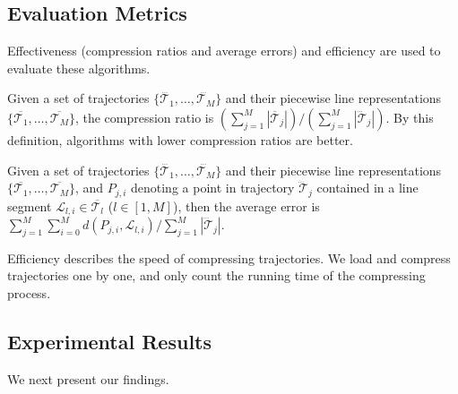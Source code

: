 \subsection{Evaluation Metrics}
Effectiveness (compression ratios and average errors) and efficiency are used to evaluate these algorithms.

Given a set of trajectories $\{\dddot{\mathcal{T}_1}, \ldots, \dddot{\mathcal{T}_M}\}$ and their piecewise line representations $\{\overline{\mathcal{T}_1}, \ldots, \overline{\mathcal{T}_M}\}$,
the compression ratio is $(\sum_{j=1}^{M} |\overline{\mathcal{T}}_j |)/(\sum_{j=1}^{M} |\dddot{\mathcal{T}}_j |)$.
By this definition, algorithms with lower compression ratios are better.

Given a set of trajectories $\{\dddot{\mathcal{T}_1}, \ldots, \dddot{\mathcal{T}_M}\}$ and their piecewise line representations
$\{\overline{\mathcal{T}_1}, \ldots, \overline{\mathcal{T}_M}\}$, and $P_{j,i}$ denoting
a point in trajectory $\dddot{\mathcal{T}}_j$ contained in a line segment $\mathcal{L}_{l,i}\in\overline{\mathcal{T}_l}$ ($l\in[1,M]$),
then the average error is $\sum_{j=1}^{M}\sum_{i=0}^{M} d(P_{j,i},
\mathcal{L}_{l,i})/\sum_{j=1}^{M}{|\dddot{\mathcal{T}}_j |}$.

Efficiency describes the speed of compressing trajectories. We load and compress trajectories one by one, and only count the running time of the compressing process.

\subsection{Experimental Results}
We next present our findings.


